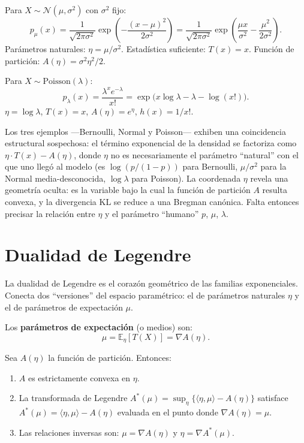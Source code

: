 \begin{example}
	Para $X \sim \mathcal{N}(\mu, \sigma^2)$ con $\sigma^2$ fijo:
	\[
	p_\mu(x) = \frac{1}{\sqrt{2\pi\sigma^2}} \exp\!\left(-\frac{(x-\mu)^2}{2\sigma^2}\right)
	= \frac{1}{\sqrt{2\pi\sigma^2}} \exp\!\left(\frac{\mu x}{\sigma^2} - \frac{\mu^2}{2\sigma^2}\right).
	\]
	Parámetros naturales: $\eta = \mu/\sigma^2$.  Estadística suficiente: $T(x) = x$.  Función de partición: $A(\eta) = \sigma^2 \eta^2/2$.
\end{example}

\begin{example}[Poisson]
	Para $X \sim \mathrm{Poisson}(\lambda)$:
	\[
	p_\lambda(x) = \frac{\lambda^x e^{-\lambda}}{x!} = \exp\!\Big(x \log\lambda - \lambda - \log(x!)\Big).
	\]
	$\eta = \log\lambda$, $T(x) = x$, $A(\eta) = e^\eta$, $h(x) = 1/x!$.
\end{example}

Los tres ejemplos ---Bernoulli, Normal y Poisson--- exhiben una coincidencia estructural sospechosa: el término exponencial de la densidad se factoriza como $\eta\!\cdot T(x)-A(\eta)$, donde $\eta$ no es necesariamente el parámetro ``natural'' con el que uno llegó al modelo (es $\log(p/(1-p))$ para Bernoulli, $\mu/\sigma^2$ para la Normal media-desconocida, $\log\lambda$ para Poisson). La coordenada $\eta$ revela una geometría oculta: es la variable bajo la cual la función de partición $A$ resulta convexa, y la divergencia KL se reduce a una Bregman canónica. Falta entonces precisar la relación entre $\eta$ y el parámetro ``humano'' $p$, $\mu$, $\lambda$.

\section{Dualidad de Legendre}

La dualidad de Legendre es el corazón geométrico de las familias exponenciales.  Conecta dos ``versiones'' del espacio paramétrico: el de parámetros naturales $\eta$ y el de parámetros de expectación $\mu$.

\begin{definition}
	Los \textbf{parámetros de expectación} (o medios) son:
	\[
	\mu = \mathbb{E}_\eta[T(X)] = \nabla A(\eta).
	\]
\end{definition}

\begin{theorem}
	Sea $A(\eta)$ la función de partición.  Entonces:
	\begin{enumerate}
		\item $A$ es estrictamente convexa en $\eta$.
		\item La transformada de Legendre $A^*(\mu) = \sup_\eta\{\langle \eta, \mu \rangle - A(\eta)\}$ satisface $A^*(\mu) = \langle \eta, \mu \rangle - A(\eta)$ evaluada en el punto donde $\nabla A(\eta) = \mu$.
		\item Las relaciones inversas son: $\mu = \nabla A(\eta)$ y $\eta = \nabla A^*(\mu)$.
	\end{enumerate}
\end{theorem}

